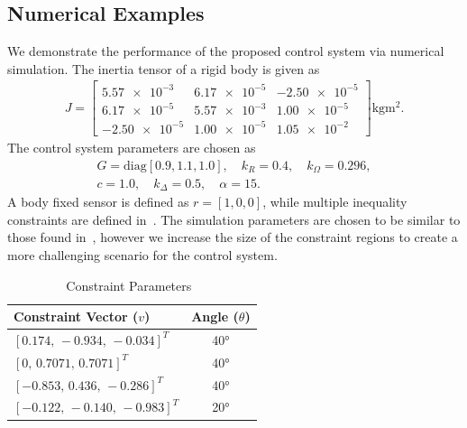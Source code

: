 \documentclass[fleqn]{IJCAS}  %
\begin{document}
\begin{multicols}{2}
\section{Numerical Examples}
We demonstrate the performance of the proposed control system via numerical simulation.
The inertia tensor of a rigid body is given as
\begin{gather*}
	J = \begin{bmatrix}
	\num{5.57e-3} & \num{6.17e-5} & \num{-2.50e-5} \\
	\num{6.17e-5} & \num{5.57e-3} & \num{1.00e-5} \\
	\num{-2.50e-5} & \num{1.00e-5} & \num{1.05e-2}
	\end{bmatrix} \si{\kilo\gram\meter\squared} .
\end{gather*} 
The control system parameters are chosen as
\begin{gather*}
	G = \text{diag} [0.9,1.1,1.0], \quad k_R = 0.4 , \quad	k_\Omega = 0.296 ,\\
	c = 1.0 , \quad k_\Delta = 0.5 , \quad \alpha = 15 .
\end{gather*}
A body fixed sensor is defined as \(r = [1,0,0]\), while multiple inequality constraints are defined in~.
The simulation parameters are chosen to be similar to those found in~\cite{lee2011b}, however we increase the size of the constraint regions to create a more challenging scenario for the control system.
\begin{table}[H]
\caption{Constraint Parameters~\label{tab:constraints}}
\begin{center}\begin{tabular}{lc}
Constraint Vector (\( v \)) & Angle (\( \theta \)) \\ \hline \hline 
\([0.174,\,-0.934,\, -0.034]^T\) & \ang{40} \\ \hline 
\([0 ,\, 0.7071 ,\, 0.7071]^T\) & \ang{40} \\ \hline 
\([-0.853 ,\, 0.436 ,\, -0.286]^T\) & \ang{40} \\ \hline 
\([-0.122 ,\,-0.140,\, -0.983]^T\) & \ang{20}\end{tabular} 
\end{center}
\end{table}


\end{multicols}
\end{document}
